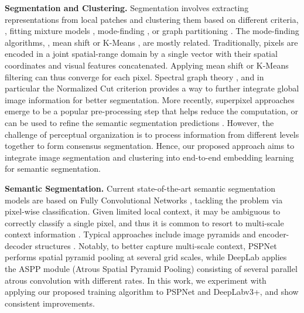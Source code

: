 \documentclass[10pt,twocolumn,letterpaper]{article}
\begin{document}
\noindent \textbf{Segmentation and Clustering.}
Segmentation involves extracting representations from local patches and clustering them based on different criteria, \eg, fitting mixture models \cite{yang2008unsupervised,belongie1998color}, mode-finding \cite{comaniciu2002mean,banerjee2005clustering}, or graph partitioning \cite{felzenszwalb2004efficient,shi2000normalized,malik2001contour,stella2003multiclass,yu2004segmentation}. The mode-finding algorithms, \eg, mean shift \cite{comaniciu2002mean} or K-Means \cite{hartigan1979algorithm,banerjee2005clustering}, are mostly related. Traditionally, pixels are encoded in a joint spatial-range domain by a single vector with their spatial coordinates and visual features concatenated. Applying mean shift or K-Means filtering can thus converge for each pixel. Spectral graph theory \cite{chung1997spectral}, and in particular the Normalized Cut \cite{shi2000normalized} criterion provides a way to further integrate global image information for better segmentation. More recently, superpixel approaches \cite{achanta2012slic} emerge to be a popular pre-processing step that helps reduce the computation, or can be used to refine the semantic segmentation predictions \cite{gadde2016superpixel}. However, the challenge of perceptual organization is to process information from different levels together to form consensus segmentation. Hence, our proposed approach aims to integrate image segmentation and clustering into end-to-end embedding learning for semantic segmentation.


\noindent \textbf{Semantic Segmentation.}
Current state-of-the-art semantic segmentation models are based on Fully Convolutional Networks \cite{lecun1989backpropagation,sermanet2013overfeat,long2015fully}, tackling the problem via pixel-wise classification. Given limited local context, it may be ambiguous to correctly classify a single pixel, and thus it is common to resort to multi-scale context information \cite{ he2004multiscale,shotton2009textonboost,kohli2009robust,ladicky2009associative,gould2009decomposing, yao2012describing, mostajabi2014feedforward,aaf2018,hwang2019adversarial}. Typical approaches include image pyramids \cite{farabet2013learning, pinheiro2014recurrent, eigen2015predicting, lin2015efficient, chen2015attention, chen2016deeplab} and encoder-decoder structures \cite{badrinarayanan2015segnet, ronneberger2015u, lin2016refinenet, fu2017stacked, peng2017large, yu2018learning, zhang2018exfuse, deeplabv3plus2018}. Notably, to better capture multi-scale context, PSPNet \cite{zhao2016pyramid} performs spatial pyramid pooling \cite{grauman2005pyramid,lazebnik2006beyond,liu2015parsenet} at several grid scales, while DeepLab \cite{chen2016deeplab,chen2017rethinking,yang2019deeperlab} applies the ASPP module (Atrous Spatial Pyramid Pooling) consisting of several parallel atrous convolution \cite{holschneider1989real,giusti2013fast,sermanet2013overfeat,papandreou2014untangling} with different rates. In this work, we experiment with applying our proposed training algorithm to PSPNet and DeepLabv3+, and show consistent improvements.
\end{document}
